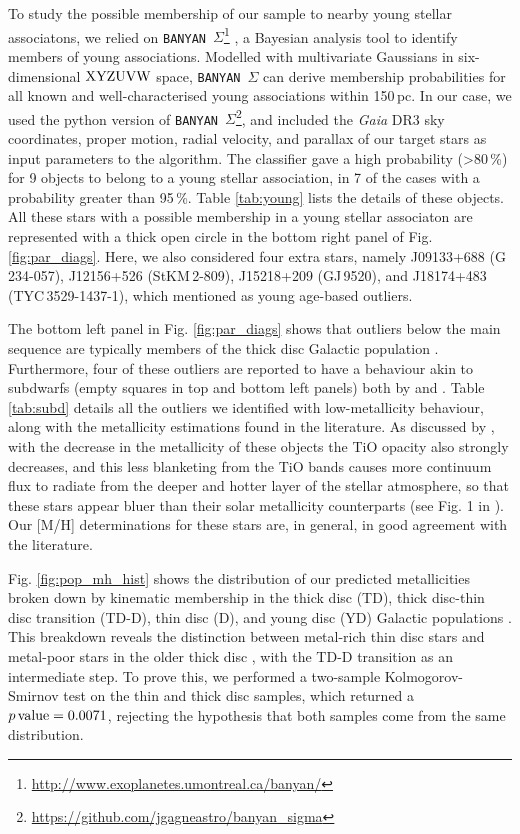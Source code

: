 To study the possible membership of our sample to nearby young stellar associatons, we relied on \texttt{BANYAN}~$\Sigma$\footnote{\url{http://www.exoplanetes.umontreal.ca/banyan/}} \citep{banyan}, a Bayesian analysis tool to identify members of young associations. Modelled with multivariate Gaussians in six-dimensional $\rm XYZUVW$ space, \texttt{BANYAN}~$\Sigma$ can derive membership probabilities for all known and well-characterised young associations within 150\,pc. In our case, we used the python version of \texttt{BANYAN}~$\Sigma$\footnote{\url{https://github.com/jgagneastro/banyan_sigma}}, and included the \textit{Gaia} DR3 sky coordinates, proper motion, radial velocity, and parallax of our target stars as input parameters to the algorithm. The classifier gave a high probability (>80\,\%) for 9 objects to belong to a young stellar association, in 7 of the cases with a probability greater than 95\,\%. Table \ref{tab:young} lists the details of these objects. All these stars with a possible membership in a young stellar associaton are represented with a thick open circle in the bottom right panel of Fig. \ref{fig:par_diags}. Here, we also considered four extra stars, namely J09133+688 (G\,234-057), J12156+526 (StKM\,2-809), J15218+209 (GJ\,9520), and J18174+483 (TYC\,3529-1437-1), which  mentioned as young age-based outliers.

The bottom left panel in Fig. \ref{fig:par_diags} shows that outliers below the main sequence are typically members of the thick disc Galactic population \citep[Cortés-Contreras et al., in prep.; ][]{tesis_miriam}. Furthermore, four of these outliers are reported to have a behaviour akin to subdwarfs (empty squares in top and bottom left panels) both by  and . Table \ref{tab:subd} details all the outliers we identified with low-metallicity behaviour, along with the metallicity estimations found in the literature. As discussed by \citet{jao2008}, with the decrease in the metallicity of these objects the TiO opacity also strongly decreases, and this less blanketing from the TiO bands causes more continuum flux to radiate from the deeper and hotter layer of the stellar atmosphere, so that these stars appear bluer than their solar metallicity counterparts (see Fig. 1 in \citealt{jao2008}). Our [M/H] determinations for these stars are, in general, in good agreement with the literature.

Fig. \ref{fig:pop_mh_hist} shows the distribution of our predicted metallicities broken down by kinematic membership in the thick disc (TD), thick disc-thin disc transition (TD-D), thin disc (D), and young disc (YD) Galactic populations \citep[Cortés-Contreras et al., in prep.; ][]{tesis_miriam}. This breakdown reveals the distinction between metal-rich thin disc stars and metal-poor stars in the older thick disc \citep{bensby2005,gaiamh2023}, with the TD-D transition as an intermediate step. To prove this, we performed a two-sample Kolmogorov-Smirnov test \citep{kolmogorov33,smirnov48} on the thin and thick disc samples, which returned a $p\,\rm{value} = 0.0071$, rejecting the hypothesis that both samples come from the same distribution.

